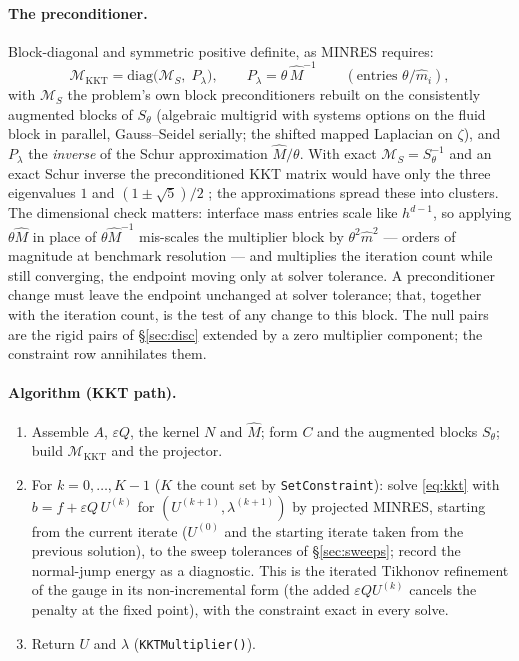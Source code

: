 \documentclass[11pt]{article}
\newcommand{\eps}{\varepsilon}
\begin{document}
\paragraph{The preconditioner.} Block-diagonal and symmetric positive
definite, as MINRES requires:
\begin{equation}
  \mathcal{M}_{\mathrm{KKT}} = \mathrm{diag}\bigl(\mathcal{M}_{S},\;
     P_\lambda\bigr), \qquad P_\lambda = \theta\, \hat M^{-1}
  \qquad (\text{entries } \theta/\hat m_i),
\end{equation}
with $\mathcal{M}_S$ the problem's own block preconditioners rebuilt on
the consistently augmented blocks of $S_\theta$ (algebraic multigrid
with systems options on the fluid block in parallel, Gauss--Seidel
serially; the shifted mapped Laplacian on $\zeta$), and $P_\lambda$ the
\emph{inverse} of the Schur approximation $\hat M/\theta$. With exact
$\mathcal{M}_S = S_\theta^{-1}$ and an exact Schur inverse the
preconditioned KKT matrix would have only the three eigenvalues $1$ and
$(1\pm\sqrt5)/2$ \cite{MurphyGolubWathen2000}; the approximations spread
these into clusters. The dimensional check matters: interface mass
entries scale like $h^{d-1}$, so applying $\theta\hat M$ in place of
$\theta\hat M^{-1}$ mis-scales the multiplier block by
$\theta^2\hat m^2$ --- orders of magnitude at benchmark resolution ---
and multiplies the iteration count while still converging, the endpoint
moving only at solver tolerance. A preconditioner change must leave the
endpoint unchanged at solver tolerance; that, together with the
iteration count, is the test of any change to this block. The null
pairs are the rigid pairs of \S\ref{sec:disc} extended by a zero
multiplier component; the constraint row annihilates them.

\paragraph{Algorithm (KKT path).}
\begin{enumerate}
\item Assemble $A$, $\eps Q$, the kernel $N$ and $\hat M$; form $C$ and
  the augmented blocks $S_\theta$; build $\mathcal{M}_{\mathrm{KKT}}$
  and the projector.
\item For $k = 0,\dots,K-1$ ($K$ the count set by
  \texttt{SetConstraint}): solve \eqref{eq:kkt} with
  $b = f + \eps Q\,U^{(k)}$ for $(U^{(k+1)}, \lambda^{(k+1)})$ by
  projected MINRES, starting from the current iterate ($U^{(0)}$ and the
  starting iterate taken from the previous solution), to the sweep
  tolerances of \S\ref{sec:sweeps}; record the normal-jump energy as a
  diagnostic. This is the iterated Tikhonov refinement of the gauge in
  its non-incremental form (the added $\eps QU^{(k)}$ cancels the
  penalty at the fixed point), with the constraint exact in every
  solve.
\item Return $U$ and $\lambda$ (\texttt{KKTMultiplier()}).
\end{enumerate}
\end{document}
